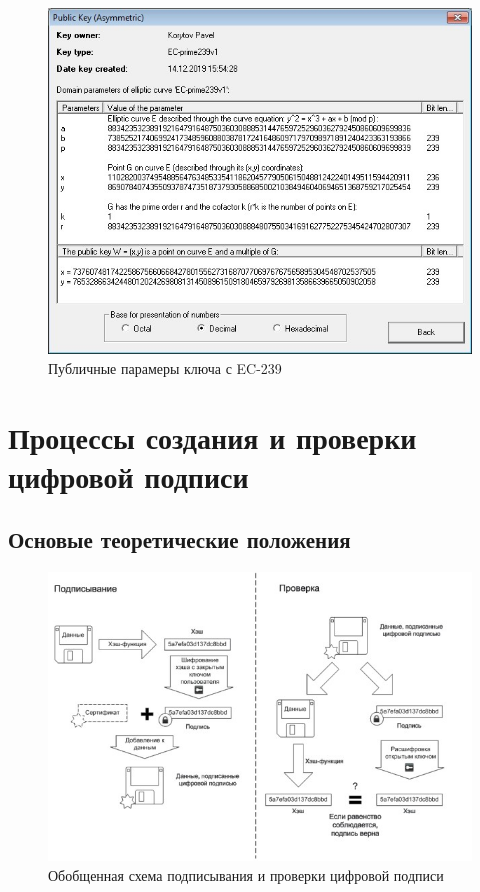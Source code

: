 \documentclass[a4paper, 14pt]{extarticle}
\begin{document}
\begin{enumerate}
        
        \begin{figure}[h]
            \centering
            \includegraphics[width=\textwidth]{img/S002.jpg}
            \caption{Публичные парамеры ключа с EC-239}%
            \label{img:1:2}
        \end{figure}
        \FloatBarrier{}

        

\end{enumerate}

\section{Процессы создания и проверки цифровой подписи}
\subsection{Основые теоретические положения}
\begin{figure}[h]
    \centering
    \includegraphics[width=\textwidth]{img/S003.jpg}
    \caption{Обобщенная схема подписывания и проверки цифровой подписи}%
    \label{img:2:1}
\end{figure}
\FloatBarrier{}
\end{document}
